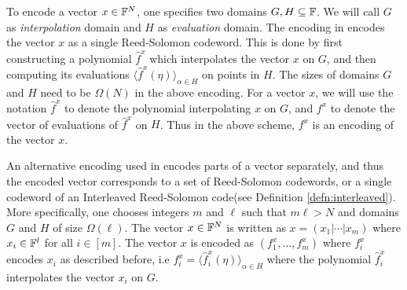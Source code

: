 To encode a vector $x\in \mathbb{F}^N$, one specifies two domains $G,H\subseteq \mathbb{F}$. We will call $G$ as {\em interpolation} domain and $H$ as {\em evaluation} domain. The encoding in \cite{Aurora} encodes the vector $x$ as a single Reed-Solomon codeword. This is done by first constructing a polynomial $\hat{f}^x$ which interpolates the vector $x$ on $G$, and then computing its evaluations $\langle \hat{f}^x(\eta) \rangle_{\alpha\in H}$ on points in $H$. The sizes of domains $G$ and $H$ need to be $\Omega(N)$ in the above encoding. For a vector $x$, we will use the notation $\hat{f}^x$ to denote the polynomial interpolating $x$ on $G$, and $f^x$ to denote the vector of evaluations of $\hat{f}^x$ on $H$. Thus in the above scheme, $f^x$ is an encoding of the vector $x$.


An alternative encoding used in \cite{Ligero2017} encodes parts of a vector separately, and thus the encoded vector corresponds to a set of Reed-Solomon codewords, or a single codeword of an Interleaved Reed-Solomon code(see Definition \ref{defn:interleaved}). More specifically, one chooses integers $m$ and $\ell$ such that $m\ell > N$ and domains $G$ and $H$ of size $\Omega(\ell)$. The vector $x\in \mathbb{F}^N$ is written as
$x=(x_1|\cdots|x_m)$ where $x_i\in \mathbb{F}^l$ for all $i\in [m]$. The vector $x$ is encoded as $(f^x_1,\ldots,f^x_m)$ where $f^x_i$ encodes $x_i$ as described before, i.e $f^x_i=\langle \hat{f}^x_i(\eta)\rangle_{\alpha\in H}$ where the polynomial $\hat{f}^x_i$ interpolates the vector $x_i$ on $G$. 

